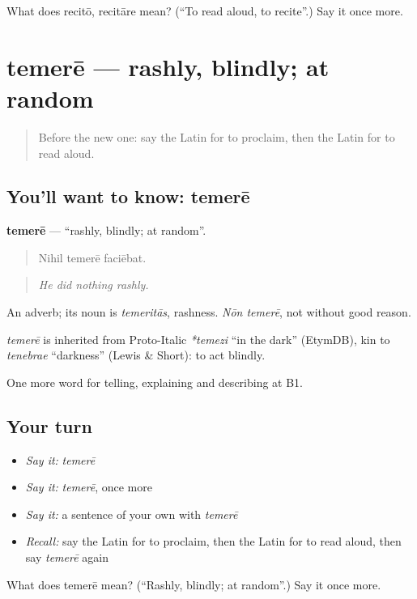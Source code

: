 \begin{tcolorbox}[breakable,colback=teal!4,colframe=teal!35!black,title={Before you move on}]
What does recitō, recitāre mean? (\textquotedblleft{}To read aloud, to recite\textquotedblright{}.) Say it once more.
\end{tcolorbox}
\section[temerē]{temerē — rashly, blindly; at random}

\label{lesson:LA-C371-temere}



\begin{quote}
Before the new one: say the Latin for to proclaim, then the Latin for to read aloud.
\end{quote}

\subsection*{You'll want to know: temerē}
\textbf{temerē} — \textquotedblleft{}rashly, blindly; at random\textquotedblright{}.

\begin{quote}
Nihil temerē faciēbat.
\end{quote}

\begin{quote}
\emph{He did nothing rashly.}
\end{quote}

An adverb; its noun is \emph{temeritās}, rashness. \emph{Nōn temerē}, not without good reason.

\begin{cousinweb}
\emph{temerē} is inherited from Proto-Italic \emph{*temezi} \textquotedblleft{}in the dark\textquotedblright{} (EtymDB), kin to \emph{tenebrae} \textquotedblleft{}darkness\textquotedblright{} (Lewis \& Short): to act blindly.
\end{cousinweb}

\begin{grammarlens}[title={What you've built}]
One more word for telling, explaining and describing at B1.
\end{grammarlens}

\subsection*{Your turn}
\begin{itemize}
\raggedright
  \item \emph{Say it:} \emph{temerē}
  \item \emph{Say it:} \emph{temerē}, once more
  \item \emph{Say it:} a sentence of your own with \emph{temerē}
  \item \emph{Recall:} say the Latin for to proclaim, then the Latin for to read aloud, then say \emph{temerē} again
\end{itemize}

\begin{tcolorbox}[breakable,colback=teal!4,colframe=teal!35!black,title={Before you move on}]
What does temerē mean? (\textquotedblleft{}Rashly, blindly; at random\textquotedblright{}.) Say it once more.
\end{tcolorbox}
